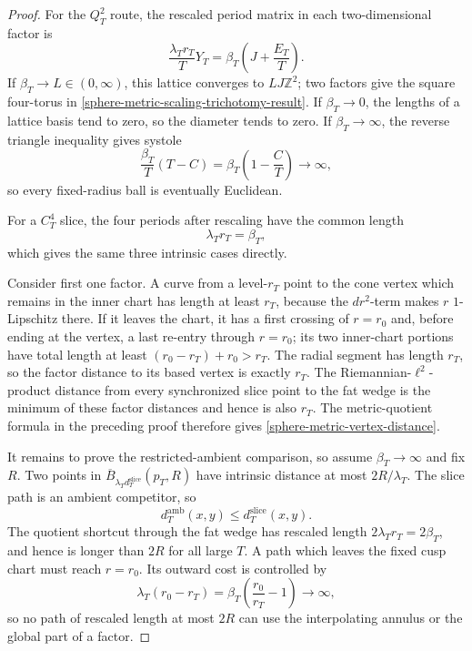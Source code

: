\begin{proof}
For the \(Q_T^2\) route, the rescaled period matrix in each two-dimensional
factor is
\[
 \frac{\lambda_Tr_T}{T}Y_T
 =\beta_T\left(J+\frac{E_T}{T}\right).
\]
If \(\beta_T\to L\in(0,\infty)\), this lattice converges to
\(LJ\mathbb Z^2\); two factors give the square four-torus in
\eqref{sphere-metric-scaling-trichotomy-result}.  If
\(\beta_T\to0\), the lengths of a lattice basis tend to zero, so the
diameter tends to zero.  If \(\beta_T\to\infty\), the reverse triangle
inequality gives systole
\[
 \frac{\beta_T}{T}(T-C)
 =\beta_T\left(1-\frac CT\right)\longrightarrow\infty,
\]
so every fixed-radius ball is eventually Euclidean.

For a \(C_T^4\) slice, the four periods after rescaling have the common
length
\[
 \lambda_Tr_T=\beta_T,
\]
which gives the same three intrinsic cases directly.

Consider first one factor.  A curve from a level-\(r_T\) point to the cone
vertex which remains in the inner chart has length at least \(r_T\), because
the \(dr^2\)-term makes \(r\) \(1\)-Lipschitz there.  If it leaves the
chart, it has a first crossing of \(r=r_0\) and, before ending at the
vertex, a last re-entry through \(r=r_0\); its two inner-chart portions
have total length at least
\((r_0-r_T)+r_0>r_T\).  The radial segment has length \(r_T\), so the
factor distance to its based vertex is exactly \(r_T\).  The
Riemannian-\(\ell^2\)-product distance from every synchronized slice point
to the fat wedge is the minimum of these factor distances and hence is
also \(r_T\).  The metric-quotient formula in the preceding proof therefore
gives \eqref{sphere-metric-vertex-distance}.

It remains to prove the restricted-ambient comparison, so assume
\(\beta_T\to\infty\) and fix \(R\).  Two points in
\(\overline B_{\lambda_Td_T^{\mathrm{slice}}}(p_T,R)\) have intrinsic
distance at most \(2R/\lambda_T\).  The slice path is an ambient competitor,
so
\[
 d_T^{\mathrm{amb}}(x,y)\leq d_T^{\mathrm{slice}}(x,y).
\]
The quotient shortcut through the fat wedge has rescaled length
\(2\lambda_Tr_T=2\beta_T\), and hence is longer than \(2R\) for all large
\(T\).  A path which leaves the fixed cusp chart must reach \(r=r_0\).
Its outward cost is controlled by
\begin{equation}
 \lambda_T(r_0-r_T)
 =\beta_T\left(\frac{r_0}{r_T}-1\right)\longrightarrow\infty,
 \label{sphere-metric-outward-shortcut-exclusion}
\end{equation}
so no path of rescaled length at most \(2R\) can use the interpolating
annulus or the global part of a factor.


\end{proof}
